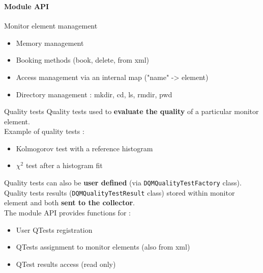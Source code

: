 \documentclass[8pt]{beamer}
\begin{document}
    
    \begin{frame}[containsverbatim]
      \frametitle{\secname}
      \framesubtitle{Module API}
      
      \begin{block}{Monitor element management}
        \begin{itemize}
          \item Memory management
          \item Booking methods (book, delete, from xml)
          \item Access management via an internal map ("name" -> element)
          \item Directory management : mkdir, cd, ls, rmdir, pwd 
        \end{itemize}
      \end{block}
      
      \begin{block}{Quality tests}
        Quality tests used to \textbf{evaluate the quality} of a particular monitor element. \\
        Example of quality tests :
        \begin{itemize}
          \item Kolmogorov test with a reference histogram
          \item $\chi^2$ test after a histogram fit
        \end{itemize}
        Quality tests can also be \textbf{user defined} (via \verb|DQMQualityTestFactory| class). \\
        Quality tests results (\verb|DQMQualityTestResult| class) stored within monitor element and both \textbf{sent to the collector}. \\
        The module API provides functions for :
        \begin{itemize}
          \item User QTests registration
          \item QTests assignment to monitor elements (also from xml)
          \item QTest results access (read only)
        \end{itemize}
      \end{block}
    \end{frame}
  
\end{document}
